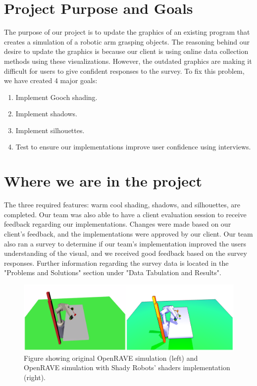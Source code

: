 \documentclass[10pt,journal,compsoc,draftclsnofoot]{IEEEtran}
\begin{document}
\begin{flushleft}

\section{Project Purpose and Goals}
The purpose of our project is to update the graphics of an existing program that creates a simulation of a robotic arm grasping objects.
The reasoning behind our desire to update the graphics is because our client is using online data collection methods using these visualizations.
However, the outdated graphics are making it difficult for users to give confident responses to the survey.
To fix this problem, we have created 4 major goals:
\begin{enumerate}
\item Implement Gooch shading.
\item Implement shadows.
\item Implement silhouettes.
\item Test to ensure our implementations improve user confidence using interviews.
\end{enumerate}

\section{Where we are in the project}
The three required features: warm cool shading, shadows, and silhouettes, are completed.
Our team was also able to have a client evaluation session to receive feedback regarding our implementations.
Changes were made based on our client's feedback, and the implementations were approved by our client.
Our team also ran a survey to determine if our team's implementation improved the users understanding of the visual, and we received good feedback based on the survey responses.
Further information regarding the survey data is located in the "Problems and Solutions" section under "Data Tabulation and Results".

\begin{figure} [H]
  \includegraphics[scale=0.8]{beforeAfter_1.eps}
  \caption
{ \newline \hspace{\linewidth}
Figure showing original OpenRAVE simulation (left) and OpenRAVE simulation with Shady Robots' shaders implementation (right).}
  \label{fig:beforeafter}
\end{figure}



\end{flushleft}
\end{document}

